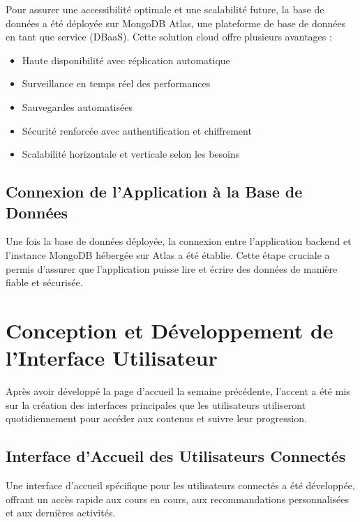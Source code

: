 Pour assurer une accessibilité optimale et une scalabilité future, la base de données a été déployée sur MongoDB Atlas, une plateforme de base de données en tant que service (DBaaS). Cette solution cloud offre plusieurs avantages :

\begin{itemize}
  \item Haute disponibilité avec réplication automatique
  \item Surveillance en temps réel des performances
  \item Sauvegardes automatisées
  \item Sécurité renforcée avec authentification et chiffrement
  \item Scalabilité horizontale et verticale selon les besoins
\end{itemize}

\subsection{Connexion de l'Application à la Base de Données}

Une fois la base de données déployée, la connexion entre l'application backend et l'instance MongoDB hébergée sur Atlas a été établie. Cette étape cruciale a permis d'assurer que l'application puisse lire et écrire des données de manière fiable et sécurisée.

\section{Conception et Développement de l'Interface Utilisateur}

Après avoir développé la page d'accueil la semaine précédente, l'accent a été mis sur la création des interfaces principales que les utilisateurs utiliseront quotidiennement pour accéder aux contenus et suivre leur progression.

\subsection{Interface d'Accueil des Utilisateurs Connectés}

Une interface d'accueil spécifique pour les utilisateurs connectés a été développée, offrant un accès rapide aux cours en cours, aux recommandations personnalisées et aux dernières activités.

